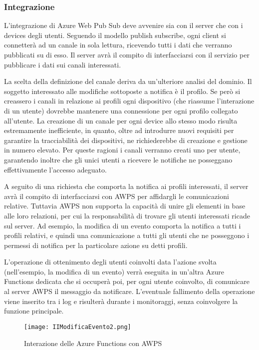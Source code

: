 \subsubsection{Integrazione}

L’integrazione di Azure Web Pub Sub deve avvenire sia con il server che con i devices degli utenti. Seguendo il modello publish subscribe, ogni client si connetterà ad un canale in sola lettura, ricevendo tutti i dati che verranno pubblicati su di esso. Il server avrà il compito di interfacciarsi con il servizio per pubblicare i dati sui canali interessati.

La scelta della definizione del canale deriva da un’ulteriore analisi del dominio. 
Il soggetto interessato alle modifiche sottoposte a notifica è il profilo. 
Se però si creassero i canali in relazione ai profili ogni dispositivo (che riassume l’interazione di un utente) dovrebbe mantenere una connessione per ogni profilo collegato all’utente. La creazione di un canale per ogni device allo stesso modo risulta estremamente inefficiente, in quanto, oltre ad introdurre nuovi requisiti per garantire la tracciabilità dei dispositivi, ne richiederebbe di creazione e gestione in numero elevato. Per queste ragioni i canali verranno creati uno per utente, garantendo inoltre che gli unici utenti a ricevere le notifiche ne posseggano effettivamente l’accesso adeguato.

A seguito di una richiesta che comporta la notifica ai profili interessati, il server avrà il compito di interfacciarsi con AWPS per affidargli le comunicazioni relative. Tuttavia AWPS non supporta la capacità di unire gli elementi in base alle loro relazioni, per cui la responsabilità di trovare gli utenti interessati ricade sul server. 
Ad esempio, la modifica di un evento comporta la notifica a tutti i profili relativi, e quindi una comunicazione a tutti gli utenti che ne posseggono i permessi di notifica per la particolare azione su detti profili. 

L’operazione di ottenimento degli utenti coinvolti data l’azione svolta (nell’esempio, la modifica di un evento) verrà eseguita in un’altra Azure Functions dedicata che si occuperà poi, per ogni utente coinvolto, di comunicare  al server AWPS il messaggio da notificare. L’eventuale fallimento della operazione viene inserito tra i log e risulterà durante i monitoraggi, senza coinvolgere la funzione principale.

		
\begin{figure}[h!]
    \centering
    \texttt{[image: IIModificaEvento2.png]}
    \caption{Interazione delle Azure Functions con AWPS}
\end{figure}	

